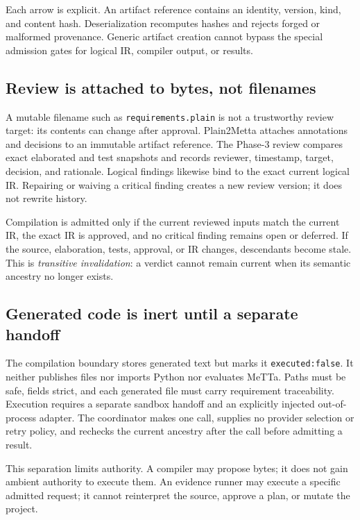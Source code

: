 \documentclass[11pt]{article}
\newcommand{\code}[1]{\texttt{#1}}
\begin{document}
Each arrow is explicit.  An artifact reference contains an identity, version,
kind, and content hash.  Deserialization recomputes hashes and rejects forged
or malformed provenance.  Generic artifact creation cannot bypass the
special admission gates for logical IR, compiler output, or results.

\subsection{Review is attached to bytes, not filenames}

A mutable filename such as \code{requirements.plain} is not a trustworthy
review target: its contents can change after approval.  Plain2Metta attaches
annotations and decisions to an immutable artifact reference.  The Phase-3
review compares exact elaborated and test snapshots and records reviewer,
timestamp, target, decision, and rationale.  Logical findings likewise bind to
the exact current logical IR.  Repairing or waiving a critical finding creates
a new review version; it does not rewrite history.

Compilation is admitted only if the current reviewed inputs match the current
IR, the exact IR is approved, and no critical finding remains open or deferred.
If the source, elaboration, tests, approval, or IR changes, descendants become
stale.  This is \emph{transitive invalidation}: a verdict cannot remain current
when its semantic ancestry no longer exists.

\subsection{Generated code is inert until a separate handoff}

The compilation boundary stores generated text but marks it
\code{executed:false}.  It neither publishes files nor imports Python nor
evaluates MeTTa.  Paths must be safe, fields strict, and each generated file
must carry requirement traceability.  Execution requires a separate sandbox
handoff and an explicitly injected out-of-process adapter.  The coordinator
makes one call, supplies no provider selection or retry policy, and rechecks
the current ancestry after the call before admitting a result.

This separation limits authority.  A compiler may propose bytes; it does not
gain ambient authority to execute them.  An evidence runner may execute a
specific admitted request; it cannot reinterpret the source, approve a plan,
or mutate the project.
\end{document}
